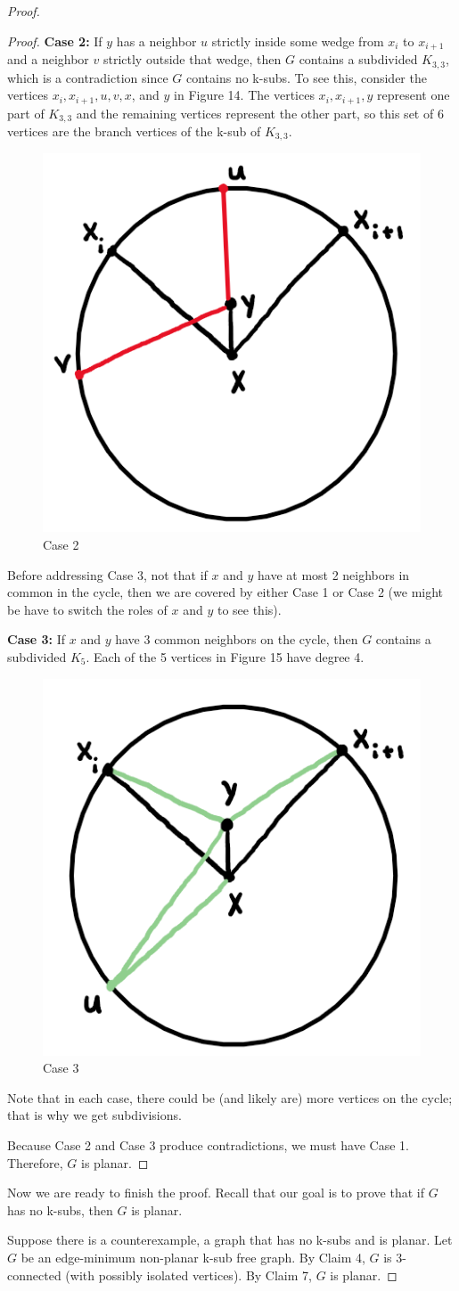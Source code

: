 \documentclass[12pt]{article}
\theoremstyle{definition}
\begin{document}
\begin{proof}
\begin{proof}
        \textbf{Case 2:} If $y$ has a neighbor $u$ strictly inside some wedge from $x_i$ to $x_{i+1}$ and a neighbor $v$ strictly outside that wedge, then $G$ contains a subdivided $K_{3,3}$, which is a contradiction since $G$ contains no k-subs. To see this, consider the vertices $x_i, x_{i+1}, u, v, x$, and $y$ in Figure 14. The vertices $x_i, x_{i+1}, y$ represent one part of $K_{3,3}$ and the remaining vertices represent the other part, so this set of 6 vertices are the branch vertices of the k-sub of $K_{3,3}$.
        \begin{figure}[hbt!]
            \centering
            \includegraphics[width=0.3\linewidth]{graphs/claim_7_2.png}
            \caption{Case 2}
        \end{figure}

        Before addressing Case 3, not that if $x$ and $y$ have at most 2 neighbors in common in the cycle, then we are covered by either Case 1 or Case 2 (we might be have to switch the roles of $x$ and $y$ to see this).

        \textbf{Case 3:} If $x$ and $y$ have 3 common neighbors on the cycle, then $G$ contains a subdivided $K_5$. Each of the 5 vertices in Figure 15 have degree 4.

        \begin{figure}[hbt!]
            \centering
            \includegraphics[width=0.3\linewidth]{graphs/claim_7_3.png}
            \caption{Case 3}
        \end{figure}

        Note that in each case, there could be (and likely are) more vertices on the cycle; that is why we get subdivisions.

        Because Case 2 and Case 3 produce contradictions, we must have Case 1. Therefore, $G$ is planar.
    \end{proof}
    Now we are ready to finish the proof. Recall that our goal is to prove that if $G$ has no k-subs, then $G$ is planar.

    Suppose there is a counterexample, a graph that has no k-subs and is planar. Let $G$ be an edge-minimum non-planar k-sub free graph. By Claim 4, $G$ is 3-connected (with possibly isolated vertices). By Claim 7, $G$ is planar.
\end{proof}
\end{document}
